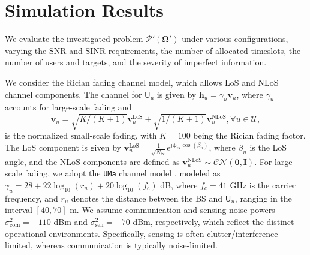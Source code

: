 \documentclass[10pt,journal,compsoc]{IEEEtran}
\theoremstyle{myremark}
\theoremstyle{myexample}
\begin{document}
\section{Simulation Results} \label{sec:simulation-results}


We evaluate the investigated problem $\mathcal{P}'(\boldsymbol{\Omega}') $ under various configurations, varying the \gls{SNR} and \gls{SINR} requirements, the number of allocated timeslots, the number of users and targets, and the severity of imperfect information.

We consider the Rician fading channel model, which allows \gls{LoS} and \gls{NLoS} channel components. The channel for $ \mathsf{U}_u $ is given by $ \mathbf{h}_u = \gamma_u \mathbf{v}_u $, where $ \gamma_u $ accounts for large-scale fading and
\begin{equation*}
	\mathbf{v}_u = \sqrt{K / (K+1)} \mathbf{v}^\mathrm{LoS}_u + \sqrt{1/(K+1)} \mathbf{v}^\mathrm{NLoS}_u, \forall u \in \mathcal{U},
\end{equation*}
is the normalized small-scale fading, with $ K = 100 $ being the Rician fading factor. The \gls{LoS} component is given by $ \mathbf{v}^\mathrm{LoS}_u = \tfrac{1}{\sqrt{N_\mathrm{tx}}} \mathrm{e}^{\mathrm{j} \boldsymbol{\phi}_\mathrm{tx} \cos \left( \beta_u \right)} $, where $ \beta_u $ is the \gls{LoS} angle, and the \gls{NLoS} components are defined as $ \mathbf{v}^\mathrm{NLoS}_u \sim \mathcal{CN} \left( \mathbf{0}, \mathbf{I} \right) $. For large-scale fading, we adopt the \texttt{UMa} channel model \cite{3gpp:38.901}, modeled as $ \gamma_u = 28 + 22 \log_{10} (r_u) + 20 \log_{10} (f_\mathrm{c}) $ dB, where $ f_\mathrm{c} = 41 $ GHz is the carrier frequency, and $ r_u $ denotes the distance between the \gls{BS} and $ \mathsf{U}_u $, ranging in the interval $ \left[ 40, 70 \right] $ m. We assume communication and sensing noise powers $ \sigma_\mathrm{com}^2 = -110 $ dBm and $ \sigma_\mathrm{sen}^2 = -70 $ dBm, respectively, which reflect the distinct operational environments. Specifically, sensing is often clutter/interference-limited, whereas communication is typically noise-limited. 
\end{document}
